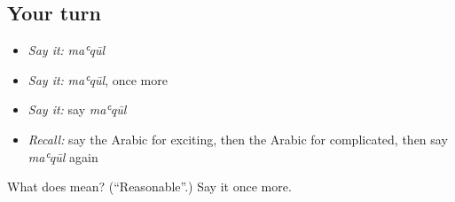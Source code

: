 \subsection*{Your turn}
\begin{itemize}
\raggedright
  \item \emph{Say it:} \emph{maʿqūl}
  \item \emph{Say it:} \emph{maʿqūl}, once more
  \item \emph{Say it:} say \emph{maʿqūl}
  \item \emph{Recall:} say the Arabic for exciting, then the Arabic for complicated, then say \emph{maʿqūl} again
\end{itemize}

\begin{tcolorbox}[breakable,colback=teal!4,colframe=teal!35!black,title={Before you move on}]
What does  mean? (\textquotedblleft{}Reasonable\textquotedblright{}.) Say it once more.
\end{tcolorbox}
